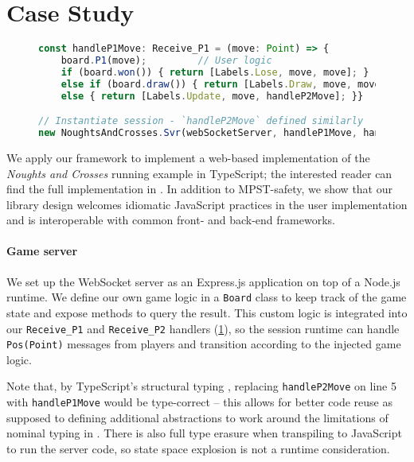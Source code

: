 \section{Case Study}
\label{section:example}

\begin{figure}
\begin{lstlisting}[language=JavaScript, tabsize=4]
const handleP1Move: Receive_P1 = (move: Point) => {
	board.P1(move);			// User logic
	if (board.won()) { return [Labels.Lose, move, move]; }
	else if (board.draw()) { return [Labels.Draw, move, move]; }
	else { return [Labels.Update, move, handleP2Move]; }}

// Instantiate session - `handleP2Move` defined similarly
new NoughtsAndCrosses.Svr(webSocketServer, handleP1Move, handleP2Move);
\end{lstlisting}
\label{lst:svrprotocol}
\end{figure}

We apply our framework to implement a web-based implementation of the
\textit{Noughts and Crosses} running example in TypeScript;
the interested reader can find the full implementation in
\cite{NoughtsAndCrosses}.
In addition to MPST-safety, we show that our library design welcomes idiomatic
JavaScript practices in the user implementation and is interoperable with
common front- and back-end frameworks.

\paragraph{Game server}
We set up the WebSocket server as an Express.js \cite{ExpressJS}
application on top of a Node.js \cite{NodeJS} runtime.
We define our own game logic in a \texttt{Board} class to keep track of the
game state and expose methods to query the result.
This custom logic is integrated into our \texttt{Receive\_P1} and
\texttt{Receive\_P2} handlers (\cref{lst:svrprotocol}), so the session runtime
can handle \texttt{Pos(Point)} messages from players and transition according
to the injected game logic.

Note that, by TypeScript's structural typing \cite{TypeScriptSpec}, replacing
\texttt{handleP2Move} on line 5 with \texttt{handleP1Move} would be
type-correct -- this allows for better code reuse as supposed to defining
additional abstractions to work around the limitations of nominal typing in
\cite{Hybrid2016}.
There is also full type erasure when transpiling to JavaScript to run the
server code, so state space explosion is not a runtime consideration.

